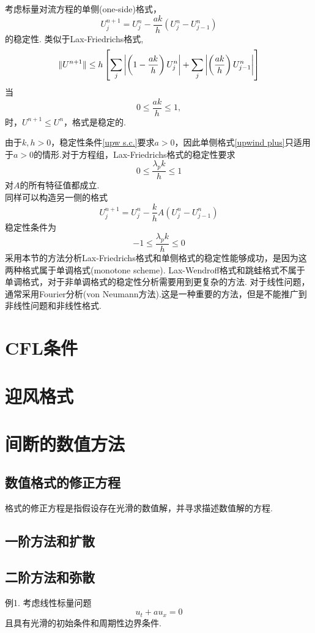 \begin{myexample}
	考虑标量对流方程的单侧(one-side)格式，
	\begin{equation} \label{upwind plus}
		U_j^{n+1} = U_j^n - \frac{ak}{h}(U_j^n - U_{j-1}^n)
	\end{equation}
	的稳定性.
	类似于Lax-Friedrichs格式,
	\begin{equation}
		\lVert U^{n+1}\rVert \le h \left[ \sum_j    \left| \left( 1-\frac{ak}{h}\right)U_j^n \right|  + \sum_j \left| \left( \frac{ak}{h}\right)U_{j-1}^n \right|  \right]
	\end{equation}
	当
	\begin{equation}\label{upw s.c.}
		0 \le \frac{ak}{h} \le 1,
	\end{equation}
	时，$U^{n+1}\le U^n$，格式是稳定的.
\end{myexample}
由于$k,h >0$，稳定性条件\eqref{upw s.c.}要求$a>0$，因此单侧格式\eqref{upwind plus}只适用于$a>0$的情形.对于方程组，Lax-Friedrichs格式的稳定性要求
	\begin{equation}
    	 0 \le \frac{\lambda_p k}{h}   \le 1
	\end{equation}
对$A$的所有特征值都成立.\\
同样可以构造另一侧的格式
	\begin{equation} 
		U_j^{n+1} = U_j^n - \frac{k}{h}A(U_j^n - U_{j-1}^n)
	\end{equation}
稳定性条件为
	\begin{equation}
	-1 \le \frac{\lambda_p k}{h}   \le 0
	\end{equation}
	采用本节的方法分析Lax-Friedrichs格式和单侧格式的稳定性能够成功，是因为这两种格式属于单调格式(monotone scheme). Lax-Wendroff格式和跳蛙格式不属于单调格式，对于非单调格式的稳定性分析需要用到更复杂的方法. 对于线性问题，通常采用Fourier分析(von Neumann方法).这是一种重要的方法，但是不能推广到非线性问题和非线性格式.
	
\section{CFL条件}

\section{迎风格式}

\section{间断的数值方法}

\subsection{数值格式的修正方程}
	格式的修正方程是指假设存在光滑的数值解，并寻求描述数值解的方程.

\subsection{一阶方法和扩散}

\subsection{二阶方法和弥散}

例1. 考虑线性标量问题 \nocite{Leveque92}
	\begin{equation*}
		u_t + a u_x = 0
	\end{equation*}
	且具有光滑的初始条件和周期性边界条件.